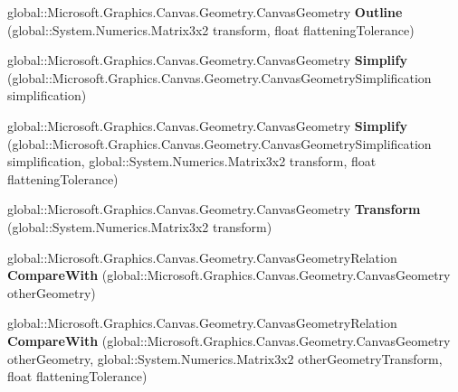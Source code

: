 \begin{DoxyCompactItemize}
global\+::\+Microsoft.\+Graphics.\+Canvas.\+Geometry.\+Canvas\+Geometry {\bfseries Outline} (global\+::\+System.\+Numerics.\+Matrix3x2 transform, float flattening\+Tolerance)
\item 
\mbox{\label{class_microsoft_1_1_graphics_1_1_canvas_1_1_geometry_1_1_canvas_geometry_a6b1ed02a2f08b0b00376d6eaca06738f}} 
global\+::\+Microsoft.\+Graphics.\+Canvas.\+Geometry.\+Canvas\+Geometry {\bfseries Simplify} (global\+::\+Microsoft.\+Graphics.\+Canvas.\+Geometry.\+Canvas\+Geometry\+Simplification simplification)
\item 
\mbox{\label{class_microsoft_1_1_graphics_1_1_canvas_1_1_geometry_1_1_canvas_geometry_a75548d17512c7e4839b879a019ea52f2}} 
global\+::\+Microsoft.\+Graphics.\+Canvas.\+Geometry.\+Canvas\+Geometry {\bfseries Simplify} (global\+::\+Microsoft.\+Graphics.\+Canvas.\+Geometry.\+Canvas\+Geometry\+Simplification simplification, global\+::\+System.\+Numerics.\+Matrix3x2 transform, float flattening\+Tolerance)
\item 
\mbox{\label{class_microsoft_1_1_graphics_1_1_canvas_1_1_geometry_1_1_canvas_geometry_a294f720439af95f7c721bc3c6c501e66}} 
global\+::\+Microsoft.\+Graphics.\+Canvas.\+Geometry.\+Canvas\+Geometry {\bfseries Transform} (global\+::\+System.\+Numerics.\+Matrix3x2 transform)
\item 
\mbox{\label{class_microsoft_1_1_graphics_1_1_canvas_1_1_geometry_1_1_canvas_geometry_a4af4b0665650464ff178a62d44d41cd9}} 
global\+::\+Microsoft.\+Graphics.\+Canvas.\+Geometry.\+Canvas\+Geometry\+Relation {\bfseries Compare\+With} (global\+::\+Microsoft.\+Graphics.\+Canvas.\+Geometry.\+Canvas\+Geometry other\+Geometry)
\item 
\mbox{\label{class_microsoft_1_1_graphics_1_1_canvas_1_1_geometry_1_1_canvas_geometry_a46984a998579f41371f806face56cd8a}} 
global\+::\+Microsoft.\+Graphics.\+Canvas.\+Geometry.\+Canvas\+Geometry\+Relation {\bfseries Compare\+With} (global\+::\+Microsoft.\+Graphics.\+Canvas.\+Geometry.\+Canvas\+Geometry other\+Geometry, global\+::\+System.\+Numerics.\+Matrix3x2 other\+Geometry\+Transform, float flattening\+Tolerance)

\end{DoxyCompactItemize}
